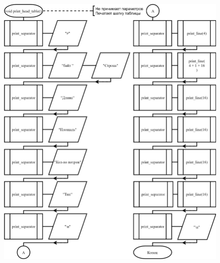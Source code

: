 \begin{figure}[!htp]
    \includegraphics{../src/menu/view_all_elements/view_all_elements-3.png}
\end{figure}

